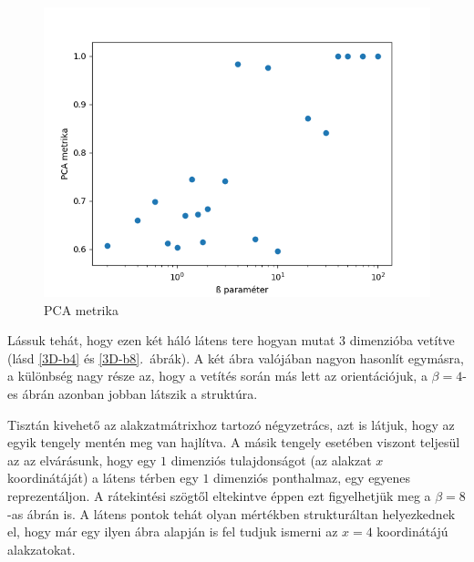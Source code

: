 \begin{figure}[h!]
\begin{center}
 
  \includegraphics[width=0.75\linewidth]{metrics/vae_beta-pca-log.png}
  \caption{PCA metrika} \label{beta-pca}
\end{center}
\end{figure}

Lássuk tehát, hogy ezen két háló látens tere hogyan mutat $3$ dimenzióba vetítve (lásd \ref{3D-b4} és \ref{3D-b8}.~ábrák). A két ábra valójában nagyon hasonlít egymásra, a különbség nagy része az, hogy a vetítés során más lett az orientációjuk, a $\beta=4$-es ábrán azonban jobban látszik a struktúra.

Tisztán kivehető az alakzatmátrixhoz tartozó négyzetrács, azt is látjuk, hogy az egyik tengely mentén meg van hajlítva. A másik tengely esetében viszont teljesül az az elvárásunk, hogy egy $1$ dimenziós tulajdonságot (az alakzat $x$ koordinátáját) a látens térben egy $1$ dimenziós ponthalmaz, egy egyenes reprezentáljon. A rátekintési szögtől eltekintve éppen ezt figyelhetjük meg a $\beta=8$-as ábrán is. A látens pontok tehát olyan mértékben strukturáltan helyezkednek el, hogy már egy ilyen ábra alapján is fel tudjuk ismerni az $x=4$ koordinátájú alakzatokat.

